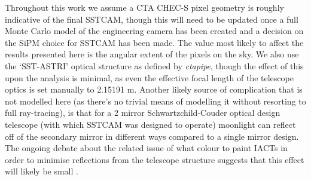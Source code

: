 Throughout this work we assume a CTA CHEC-S pixel geometry is roughly indicative of the final SSTCAM, though this will need to be updated once a full Monte Carlo model of the engineering camera has been created and a decision on the SiPM choice for SSTCAM has been made. The value most likely to affect the results presented here is the angular extent of the pixels on the sky. We also use the `SST-ASTRI' optical structure as defined by \textit{ctapipe}, though the effect of this upon the analysis is minimal, as even the effective focal length of the telescope optics is set manually to 2.15191 m. Another likely source of complication that is not modelled here (as there's no trivial means of modelling it without resorting to full ray-tracing), is that for a 2 mirror Schwartzchild-Couder optical design telescope (with which SSTCAM was designed to operate) moonlight can reflect off of the secondary mirror in different ways compared to a single mirror design. The ongoing debate about the related issue of what colour to paint IACTs in order to minimise reflections from the telescope structure suggests that this effect will likely be small \cite{pinktelescope}.

\label{sec:examples}
